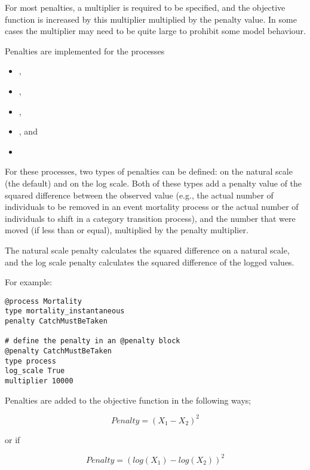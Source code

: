For most penalties, a multiplier is required to be specified, and the objective function is increased by this multiplier multiplied by the penalty value. In some cases the multiplier may need to be quite large to prohibit some model behaviour.

Penalties are implemented for the processes

\begin{itemize}
	\item {},
	\item {},
	\item {},
	\item {}, and
	\item {}
\end{itemize}

For these processes, two types of penalties can be defined: on the natural scale (the default) and on the log scale. Both of these types add a penalty value of the squared difference between the observed value (e.g., the actual number of individuals to be removed in an event mortality process or the actual number of individuals to shift in a category transition process), and the number that were moved (if less than or equal), multiplied by the penalty multiplier.

The natural scale penalty calculates the squared difference on a natural scale, and the log scale penalty calculates the squared difference of the logged values.

For example:

{\small{\begin{verbatim}
@process Mortality
type mortality_instantaneous
penalty CatchMustBeTaken

# define the penalty in an @penalty block
@penalty CatchMustBeTaken
type process
log_scale True
multiplier 10000
\end{verbatim}}}

Penalties are added to the objective function in the following ways;

\begin{equation}
	Penalty = (X_1 - X_2)^2
\end{equation}

or if 

\begin{equation}
Penalty = (log(X_1) - log(X_2))^2
\end{equation}

